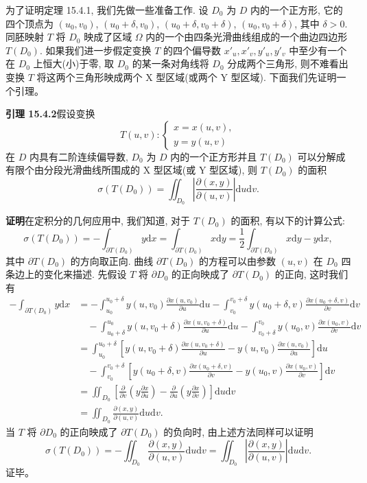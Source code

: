 \documentclass[UTF8,12pt,a4paper,fontset=fandol]{ctexart}
\begin{document}
为了证明定理 15.4.1, 我们先做一些准备工作. 设 $D_0$ 为 $D$ 内的一个正方形, 它的四个顶点为 $(u_0,v_0)$, $(u_0+\delta,v_0)$, $(u_0+\delta,v_0+\delta)$, $(u_0,v_0+\delta)$, 其中 $\delta>0$. 同胚映射 $T$ 将 $D_0$ 映成了区域 $\Omega$ 内的一个由四条光滑曲线组成的一个曲边四边形 $T(D_0)$. 如果我们进一步假定变换 $T$ 的四个偏导数 $x'_u,x'_v,y'_u,y'_v$ 中至少有一个在 $D_0$ 上恒大(小)于零, 取 $D_0$ 的某一条对角线将 $D_0$ 分成两个三角形, 则不难看出变换 $T$ 将这两个三角形映成两个 X 型区域(或两个 Y 型区域). 下面我们先证明一个引理。

\noindent\textbf{引理 15.4.2}\quad 假设变换
\[
  T(u,v):
  \begin{cases}
    x=x(u,v),\\
    y=y(u,v)
  \end{cases}
\]
在 $D$ 内具有二阶连续偏导数, $D_0$ 为 $D$ 内的一个正方形并且 $T(D_0)$ 可以分解成有限个由分段光滑曲线所围成的 X 型区域(或 Y 型区域), 则 $T(D_0)$ 的面积
\[
  \sigma(T(D_0))=\iint_{D_0}\left|\frac{\partial(x,y)}{\partial(u,v)}\right|\mathrm du\mathrm dv.
\]

\noindent\textbf{证明}\quad 在定积分的几何应用中, 我们知道, 对于 $T(D_0)$ 的面积, 有以下的计算公式:
\[
  \sigma(T(D_0))=-\int_{\partial T(D_0)}y\mathrm dx
  =\int_{\partial T(D_0)}x\mathrm dy
  =\frac12\int_{\partial T(D_0)}x\mathrm dy-y\mathrm dx,
\]
其中 $\partial T(D_0)$ 的方向取正向. 曲线 $\partial T(D_0)$ 的方程可以由参数 $(u,v)$ 在 $D_0$ 四条边上的变化来描述. 先假设 $T$ 将 $\partial D_0$ 的正向映成了 $\partial T(D_0)$ 的正向, 这时我们有
\[
\begin{aligned}
  -\int_{\partial T(D_0)}y\mathrm dx
  &=-\int_{u_0}^{u_0+\delta}y(u,v_0)\frac{\partial x(u,v_0)}{\partial u}\mathrm du
    -\int_{v_0}^{v_0+\delta}y(u_0+\delta,v)\frac{\partial x(u_0+\delta,v)}{\partial v}\mathrm dv\\
  &\quad-\int_{u_0+\delta}^{u_0}y(u,v_0+\delta)\frac{\partial x(u,v_0+\delta)}{\partial u}\mathrm du
    -\int_{v_0+\delta}^{v_0}y(u_0,v)\frac{\partial x(u_0,v)}{\partial v}\mathrm dv\\
  &=\int_{u_0}^{u_0+\delta}
    \left[y(u,v_0+\delta)\frac{\partial x(u,v_0+\delta)}{\partial u}
    -y(u,v_0)\frac{\partial x(u,v_0)}{\partial u}\right]\mathrm du\\
  &\quad-\int_{v_0}^{v_0+\delta}
    \left[y(u_0+\delta,v)\frac{\partial x(u_0+\delta,v)}{\partial v}
    -y(u_0,v)\frac{\partial x(u_0,v)}{\partial v}\right]\mathrm dv\\
  &=\iint_{D_0}\left[
    \frac{\partial}{\partial v}\left(y\frac{\partial x}{\partial u}\right)
    -\frac{\partial}{\partial u}\left(y\frac{\partial x}{\partial v}\right)
    \right]\mathrm du\mathrm dv\\
  &=\iint_{D_0}\frac{\partial(x,y)}{\partial(u,v)}\mathrm du\mathrm dv.
\end{aligned}
\]
当 $T$ 将 $\partial D_0$ 的正向映成了 $\partial T(D_0)$ 的负向时, 由上述方法同样可以证明
\[
  \sigma(T(D_0))=-\iint_{D_0}\frac{\partial(x,y)}{\partial(u,v)}\mathrm du\mathrm dv
  =\iint_{D_0}\left|\frac{\partial(x,y)}{\partial(u,v)}\right|\mathrm du\mathrm dv.
\]
证毕。
\end{document}
